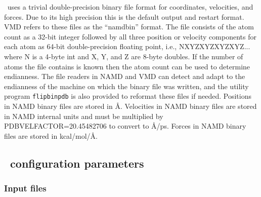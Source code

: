 \NAMD\ uses a trivial double-precision binary file format for
coordinates, velocities, and forces.
Due to its high precision this is the default output
and restart format.
VMD refers to these files as the ``namdbin'' format.
The file consists of the atom count
as a 32-bit integer followed by all three position or velocity
components for each atom as 64-bit double-precision floating point,
i.e., NXYZXYZXYZXYZ... where N is a 4-byte int and X, Y, and Z
are 8-byte doubles.  If the number of atoms the file contains is
known then the atom count can be used to determine endianness.
The file readers in NAMD and VMD can detect and
adapt to the endianness of the machine on which the binary
file was written, and the utility program {\tt flipbinpdb}
is also provided to reformat these files if needed.
Positions in NAMD binary files are stored in \AA.
Velocities in NAMD binary files are stored in NAMD internal
units and must be multiplied by PDBVELFACTOR=20.45482706
to convert to \AA/ps.
Forces in NAMD binary files are stored in kcal/mol/\AA.

\subsection{\NAMD\ configuration parameters}
\label{section:file_config}

\subsubsection{Input files}

